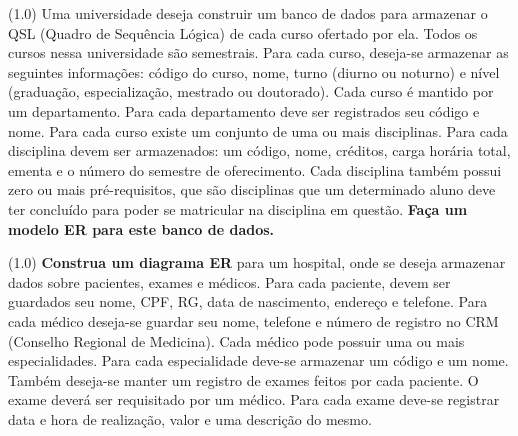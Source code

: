 \documentclass[12pt]{exam}
\begin{document}
\begin{questions}


\question (1.0) Uma universidade deseja construir um banco de dados para armazenar o QSL (Quadro de Sequência Lógica) de cada curso ofertado por ela. Todos os cursos nessa universidade são semestrais. Para cada curso, deseja-se armazenar as seguintes informações: código do curso, nome, turno (diurno ou noturno) e nível (graduação, especialização, mestrado ou doutorado). Cada curso é mantido por um departamento. Para cada departamento deve ser registrados seu código e nome. Para cada curso existe um conjunto de uma ou mais disciplinas. Para cada disciplina devem ser armazenados: um código, nome, créditos, carga horária total, ementa e o número do semestre de oferecimento. Cada disciplina também possui zero ou mais pré-requisitos, que são disciplinas que um determinado aluno deve ter concluído para poder se matricular na disciplina em questão. 
\textbf{Faça um modelo ER para este banco de dados.}
\label{ER-Exercicio-universidade}



\question (1.0) \textbf{Construa um diagrama ER} para um hospital, onde se deseja armazenar dados sobre pacientes, exames e médicos. Para cada paciente, devem ser guardados seu nome, CPF, RG, data de nascimento, endereço e telefone. Para cada médico deseja-se guardar seu nome, telefone e número de registro no CRM (Conselho Regional de Medicina). Cada médico pode possuir uma ou mais especialidades. Para cada especialidade deve-se armazenar um código e um nome. Também deseja-se manter um registro de exames feitos por cada paciente. O exame deverá ser requisitado por um médico. Para cada exame deve-se registrar data e hora de realização, valor e uma descrição do mesmo.  \label{ER-Exercicio-hospital}


\end{questions}
\end{document}
